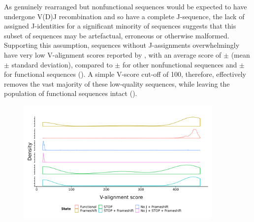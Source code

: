 As genuinely rearranged but nonfunctional sequences would be expected to have undergone V(D)J recombination and so have a complete J-sequence, the lack of assigned J-identities for a significant minority of sequences suggests that this subset of sequences may be artefactual, erroneous or otherwise malformed. Supporting this assumption, sequences without J-assignments overwhelmingly have very low V-alignment scores reported by , with an average score of  $\pm$  (mean $\pm$ standard deviation), compared to  $\pm$  for other nonfunctional sequences and  $\pm$  for functional sequences (). A simple V-score cut-off of 100, therefore, effectively removes the vast majority of these low-quality sequences, while leaving the population of functional sequences intact ().

\begin{figure}
\centering
\includegraphics[width = 0.9\textwidth]{_Figures/png/pilot-functional-vscores}
\label{fig:igseq-pilot-functional-vscores}
\end{figure}

